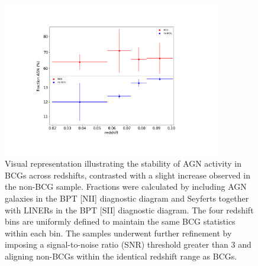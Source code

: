 \begin{figure}[t]
  \centering
  \includegraphics[width=0.85\textwidth]{zfractionAGN}
  \caption{Visual representation illustrating the stability of AGN activity in BCGs across redshifts, contrasted with a slight increase observed in the non-BCG sample. Fractions were calculated by including AGN galaxies in the BPT [NII] diagnostic diagram and Seyferts together with LINERs in the BPT [SII] diagnostic diagram. The four redshift bins are uniformly defined to maintain the same BCG statistics within each bin. The samples underwent further refinement by imposing a signal-to-noise ratio (SNR) threshold greater than 3 and aligning non-BCGs within the identical redshift range as BCGs.}
  \label{IMG:frac_z}
\end{figure}

